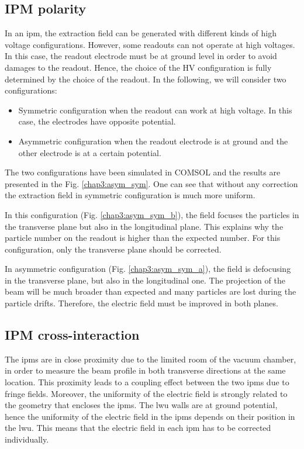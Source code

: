 \begin{refsection}
  \subsection{IPM polarity}

  In an \acrshort{ipm}, the extraction field can be generated with different kinds of high voltage configurations. However, some readouts can not operate at high voltages. In this case, the readout electrode must be at ground level in order to avoid damages to the readout. Hence, the choice of the HV configuration is fully determined by the choice of the readout. In the following, we will consider two configurations:
  \begin{itemize}
    \item Symmetric configuration when the readout can work at high voltage. In this case, the electrodes have opposite potential.
    \item Asymmetric configuration when the readout electrode is at ground and the other electrode is at a certain potential.
  \end{itemize}

  The two configurations have been simulated in COMSOL and the results are presented in the Fig. \ref{chap3:asym_sym}. One can see that without any correction the extraction field in symmetric configuration is much more uniform.

  

  In this configuration (Fig. \ref{chap3:asym_sym_b}), the field focuses the particles in the transverse plane but also in the longitudinal plane. This explains why the particle number on the readout is higher than the expected number. For this configuration, only the transverse plane should be corrected.

  In asymmetric configuration (Fig. \ref{chap3:asym_sym_a}), the field is defocusing in the transverse plane, but also in the  longitudinal one. The projection of the beam will be much broader than expected and many particles are lost during the particle drifts. Therefore, the electric field must be improved in both planes.


  \subsection{IPM cross-interaction}

  The \acrshort{ipm}s are in close proximity due to the limited room of the vacuum chamber, in order to measure the beam profile in both  transverse  directions at the same location. This proximity leads to a coupling effect between the two \acrshort{ipm}s due to fringe fields. Moreover, the uniformity of the electric field is strongly related to the geometry that encloses the \acrshort{ipm}s. The \acrshort{lwu} walls are at ground potential, hence the uniformity of the electric field in the \acrshort{ipm}s depends on their position in the \acrshort{lwu}. This means that the electric field in each \acrshort{ipm} has to be corrected individually.


\end{refsection}
